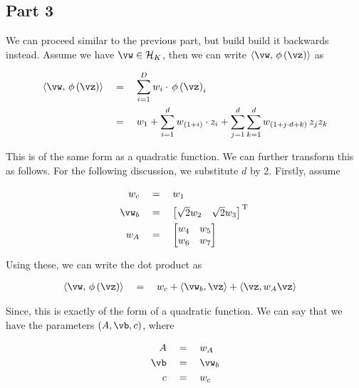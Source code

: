 \documentclass{article}
\begin{document}
\begin{mlsolution}
\begin{addmargin}{1.5em}
	\end{addmargin}

	\subsection*{Part 3}
	\begin{addmargin}{1.5em}

		We can proceed similar to the previous part, but build build it backwards instead. Assume we have $\vw \in \Hlb$, then we can write $\ip{\vw}{\func{\phi}{\vz}}$ as

		\begin{align*}
			\ip{\vw}{\func{\phi}{\vz}}	&\eq	\sum_{i = 1}^D w_i \cdot \func{\phi}{\vz}_i \\
			&\eq	w_1 + \sum_{i = 1}^d w_{\para{1 + i}} \cdot z_i + \sum_{j = 1}^d \sum_{k = 1}^d w_{\para{1 + j \cdot d + k}} \, z_j z_k
		\end{align*}

		This is of the same form as a quadratic function. We can further transform this as follows. For the following discussion, we substitute $d$ by 2. Firstly, assume

		\begin{align*}
			w_c		&\eq	w_1 \\
			\vw_b	&\eq	\brac{\begin{matrix}
						\sqrt{2} w_2 &	\sqrt{2} w_3
							\end{matrix}}^{\mt{T}} \\
			w_A		&\eq	\brac{\begin{matrix}
								w_4	&	w_5 \\
								w_6	&	w_7
							\end{matrix}}
		\end{align*}

		Using these, we can write the dot product as

		\begin{align*}
			\ip{\vw}{\func{\phi}{\vz}}	&\eq	w_c + \ip{\vw_b}{\vz} + \ip{\vz}{w_A \vz}
		\end{align*}

		Since, this is exactly of the form of a quadratic function. We can say that we have the parameters $\para{A, \vb, c}$, where

		\begin{align*}
			A	&\eq	w_A \\
			\vb	&\eq	\vw_b \\
			c	&\eq	w_c
		\end{align*}


\end{addmargin}
\end{mlsolution}
\end{document}
